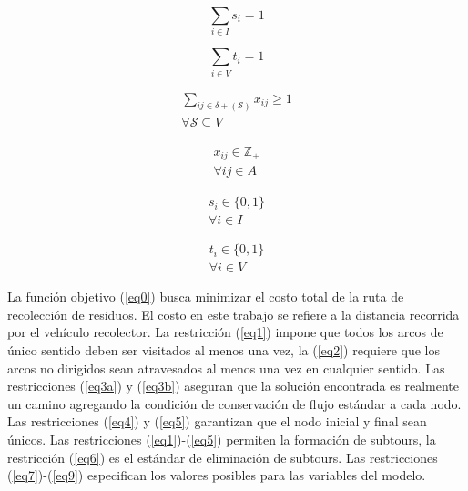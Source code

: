 \begin{equation} \tag{4} \label{eq4}
\sum_{i \in I} s_i = 1 
\end{equation}
\hbox{}

\begin{equation} \tag{5} \label{eq5}
\sum_{i \in V} t_i = 1 
\end{equation}
\hbox{}

\begin{equation} \tag{6} \label{eq6}
\begin{gathered}
    \sum_{i j \in \delta + (\mathcal{S})} x_{i j} \geq 1 \\
    \forall \mathcal{S} \subseteq V
\end{gathered}
\end{equation}
\hbox{}

\begin{equation} \tag{7} \label{eq7}
\begin{gathered}
    x_{i j} \in \mathbb{Z}_+ \\
    \forall i j \in A
\end{gathered}
\end{equation}
\hbox{}

\begin{equation} \tag{8} \label{eq8}
\begin{gathered}
    s_i \in \{0,1\} \\
    \forall i \in I
\end{gathered}
\end{equation}
\hbox{}

\begin{equation} \tag{9} \label{eq9}
\begin{gathered}
    t_i \in \{0,1\} \\
    \forall i \in V
\end{gathered}
\end{equation}

La función objetivo (\ref{eq0}) busca minimizar el costo total de la ruta de recolección de residuos. El costo en este trabajo se refiere a la distancia recorrida por el vehículo recolector. La restricción (\ref{eq1}) impone que todos los arcos de único sentido deben ser visitados al menos una vez, la (\ref{eq2}) requiere que los arcos no dirigidos sean atravesados al menos una vez en cualquier sentido. Las restricciones (\ref{eq3a}) y (\ref{eq3b}) aseguran que la solución encontrada es realmente un camino agregando la condición de conservación de flujo estándar a cada nodo. Las restricciones (\ref{eq4}) y (\ref{eq5}) garantizan que el nodo inicial y final sean únicos. Las restricciones (\ref{eq1})-(\ref{eq5}) permiten la formación de subtours, la restricción (\ref{eq6}) es el estándar de eliminación de subtours. Las restricciones (\ref{eq7})-(\ref{eq9}) especifican los valores posibles para las variables del modelo.


